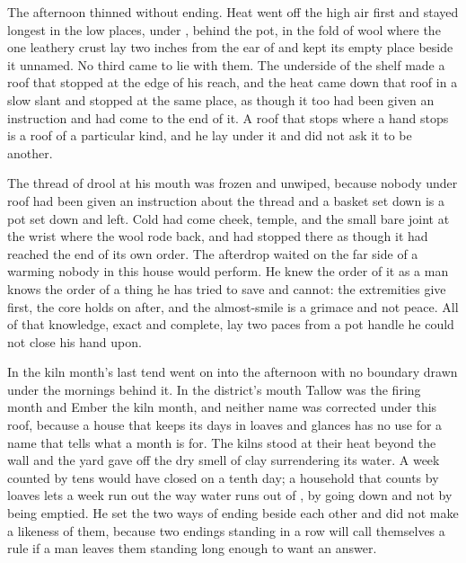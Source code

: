 The afternoon thinned without ending. Heat went off the high air first and stayed longest in the low places, under , behind the pot, in the fold of wool where the one leathery crust lay two inches from the ear of  and kept its empty place beside it unnamed. No third came to lie with them. The underside of the shelf made a roof that stopped at the edge of his reach, and the heat came down that roof in a slow slant and stopped at the same place, as though it too had been given an instruction and had come to the end of it. A roof that stops where a hand stops is a roof of a particular kind, and he lay under it and did not ask it to be another.

The thread of drool at his mouth was frozen and unwiped, because nobody under  roof had been given an instruction about the thread and a basket set down is a pot set down and left. Cold had come cheek, temple, and the small bare joint at the wrist where the wool rode back, and had stopped there as though it had reached the end of its own order. The afterdrop waited on the far side of a warming nobody in this house would perform. He knew the order of it as a man knows the order of a thing he has tried to save and cannot: the extremities give first, the core holds on after, and the almost-smile is a grimace and not peace. All of that knowledge, exact and complete, lay two paces from a pot handle he could not close his hand upon.

In  the kiln month's last tend went on into the afternoon with no boundary drawn under the mornings behind it. In the district's mouth Tallow was the firing month and Ember the kiln month, and neither name was corrected under this roof, because a house that keeps its days in loaves and glances has no use for a name that tells what a month is for. The kilns stood at their heat beyond the wall and the yard gave off the dry smell of clay surrendering its water. A week counted by tens would have closed on a tenth day; a household that counts by loaves lets a week run out the way water runs out of , by going down and not by being emptied. He set the two ways of ending beside each other and did not make a likeness of them, because two endings standing in a row will call themselves a rule if a man leaves them standing long enough to want an answer.

\scenebreak


